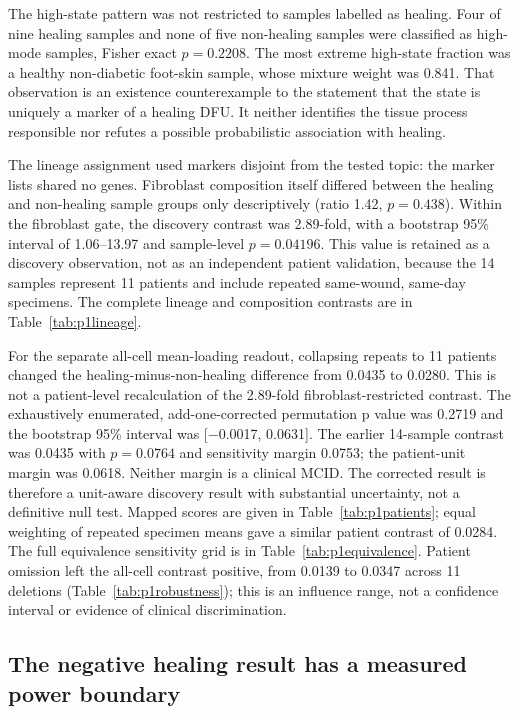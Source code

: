 The high-state pattern was not restricted to samples labelled as healing. Four of nine healing samples and none of five non-healing samples were classified as high-mode samples, Fisher exact $p=0.2208$. The most extreme high-state fraction was a healthy non-diabetic foot-skin sample, whose mixture weight was 0.841. That observation is an existence counterexample to the statement that the state is uniquely a marker of a healing DFU. It neither identifies the tissue process responsible nor refutes a possible probabilistic association with healing.

The lineage assignment used markers disjoint from the tested topic: the marker lists shared no genes. Fibroblast composition itself differed between the healing and non-healing sample groups only descriptively (ratio 1.42, $p=0.438$). Within the fibroblast gate, the discovery contrast was 2.89-fold, with a bootstrap 95\% interval of 1.06--13.97 and sample-level $p=0.04196$. This value is retained as a discovery observation, not as an independent patient validation, because the 14 samples represent 11 patients and include repeated same-wound, same-day specimens. The complete lineage and composition contrasts are in Table~\ref{tab:p1lineage}.

For the separate all-cell mean-loading readout, collapsing repeats to 11 patients changed the healing-minus-non-healing difference from 0.0435 to 0.0280. This is not a patient-level recalculation of the 2.89-fold fibroblast-restricted contrast. The exhaustively enumerated, add-one-corrected permutation p value was 0.2719 and the bootstrap 95\% interval was {[}−0.0017, 0.0631{]}. The earlier 14-sample contrast was 0.0435 with $p=0.0764$ and sensitivity margin 0.0753; the patient-unit margin was 0.0618. Neither margin is a clinical MCID. The corrected result is therefore a unit-aware discovery result with substantial uncertainty, not a definitive null test. Mapped scores are given in Table~\ref{tab:p1patients}; equal weighting of repeated specimen means gave a similar patient contrast of 0.0284. The full equivalence sensitivity grid is in Table~\ref{tab:p1equivalence}. Patient omission left the all-cell contrast positive, from 0.0139 to 0.0347 across 11 deletions (Table~\ref{tab:p1robustness}); this is an influence range, not a confidence interval or evidence of clinical discrimination.

\subsection{The negative healing result has a measured power boundary}

